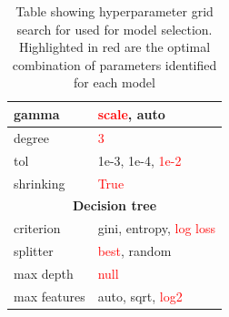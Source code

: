 \documentclass[11pt,a4paper]{article}
\begin{document}
\begin{table}[]
\begin{tabular}{ll}
    \multicolumn{1}{|l|}{gamma} & \multicolumn{1}{l|}{\textcolor{red}{scale}, auto} \\ \hline
    \multicolumn{1}{|l|}{degree} & \multicolumn{1}{l|}{\textcolor{red}{3}} \\ \hline
    \multicolumn{1}{|l|}{tol} & \multicolumn{1}{l|}{1e-3, 1e-4, \textcolor{red}{1e-2}} \\ \hline
    \multicolumn{1}{|l|}{shrinking} & \multicolumn{1}{l|}{\textcolor{red}{True}} \\ \hline
    \multicolumn{2}{||c||}{\textbf{Decision tree}} \\ \hline
    \multicolumn{1}{|l|}{criterion} & \multicolumn{1}{l|}{gini, entropy, \textcolor{red}{log loss}} \\ \hline
    \multicolumn{1}{|l|}{splitter} & \multicolumn{1}{l|}{\textcolor{red}{best}, random} \\ \hline
    \multicolumn{1}{|l|}{max depth} & \multicolumn{1}{l|}{\textcolor{red}{null}} \\ \hline
    \multicolumn{1}{|l|}{max features} & \multicolumn{1}{l|}{auto, sqrt, \textcolor{red}{log2}} \\ \hline
\end{tabular}
\label{tab:TAB_hyperparameters}
\caption{Table showing hyperparameter grid search for used for model selection. Highlighted in red are the optimal combination of parameters identified for each model}
\end{table}
\end{document}
